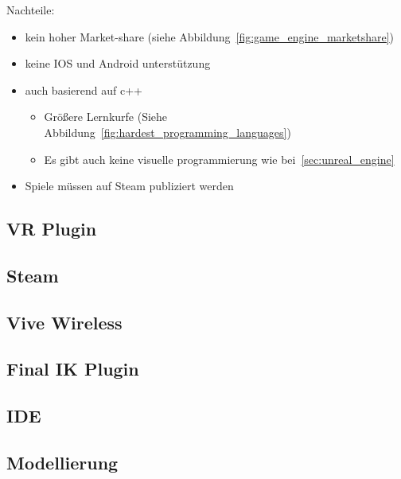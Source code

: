 Nachteile:

\begin{itemize}
    \item kein hoher Market-share (siehe Abbildung~\ref{fig:game_engine_marketshare})
    \item keine IOS und Android unterstützung
    \item auch basierend auf c++
    \begin{itemize}
        \item Größere Lernkurfe (Siehe Abbildung~\ref{fig:hardest_programming_languages})
        \item Es gibt auch keine visuelle programmierung wie bei~\ref{sec:unreal_engine}
    \end{itemize}
    \item Spiele müssen auf Steam publiziert werden
\end{itemize}



\subsection{VR Plugin}

\subsection{Steam}

\subsection{Vive Wireless}

\subsection{Final IK Plugin}

\subsection{IDE}

\subsection{Modellierung}
